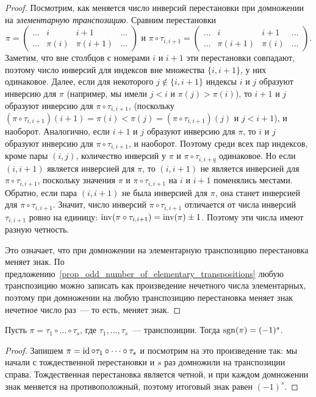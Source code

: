 \begin{proof}
Посмотрим, как меняется число инверсий перестановки при домножении на
{\it элементарную транспозицию}. Сравним перестановки
$$
\pi=\begin{pmatrix}\dots&i&i+1&\dots\\
\dots&\pi(i)&\pi(i+1)&\dots\end{pmatrix}\text{ и }
\pi\circ\tau_{i,i+1}=\begin{pmatrix}\dots&i&i+1&\dots\\
\dots&\pi(i+1)&\pi(i)&\dots\end{pmatrix}.
$$
Заметим, что вне столбцов с номерами $i$ и $i+1$ эти перестановки
совпадают, поэтому число инверсий для индексов вне множества
$\{i,i+1\}$, у них одинаковое. Далее, если для некоторого
$j\notin\{i,i+1\}$ индексы $i$ и $j$ образуют
инверсию для $\pi$ (например, мы имели $j<i$ и $\pi(j)>\pi(i)$), то
$i+1$ и $j$ образуют инверсию для $\pi\circ\tau_{i,i+1}$,
(поскольку
$(\pi\circ\tau_{i,i+1})(i+1)=\pi(i)<\pi(j)=(\pi\circ\tau_{i,i+1})(j)$
и $j<i+1$), и наоборот. Аналогично, если $i+1$ и $j$ образуют
инверсию для $\pi$, то $i$ и $j$ образуют инверсию для
$\pi\circ\tau_{i,i+1}$, и наоборот. Поэтому среди всех пар индексов,
кроме пары $(i,j)$, количество инверсий у $\pi$ и
$\pi\circ\tau_{i,i+q}$ одинаковое. Но если $(i,i+1)$ является
инверсией для $\pi$, то $(i,i+1)$ не является инверсией для
$\pi\circ\tau_{i,i+1}$, поскольку значения $\pi$ и
$\pi\circ\tau_{i,i+1}$ на $i$ и $i+1$ поменялись местами. Обратно,
если пара $(i,i+1)$ не была инверсией для $\pi$, она станет инверсией
для $\pi\circ\tau_{i,i+1}$. Значит, число инверсий
$\pi\circ\tau_{i,i+1}$ отличается от числа инверсий $\tau_{i,i+1}$
ровно на единицу: $\operatorname{inv}(\pi\circ\tau_{i,i+1})=\operatorname{inv}(\pi)\pm 1$. Поэтому
эти числа имеют разную четность.

Это означает, что при домножении на элементарную транспозицию
перестановка меняет знак. По
предложению~\ref{prop_odd_number_of_elementary_transpositions} любую
транспозицию можно записать как произведение нечетного числа
элементарных, поэтому при домножении на любую транспозицию
перестановка меняет знак нечетное число раз~--- то есть, меняет знак.
\end{proof}

\begin{corollary}\label{cor_sign_and_number_of_transpositions}
Пусть $\pi=\tau_1\circ\dots\circ\tau_s$, где $\tau_1,\dots,\tau_s$~---
транспозиции. Тогда $\operatorname{sgn}(\pi)=(-1)^s$.
\end{corollary}
\begin{proof}
Запишем $\pi=\operatorname{id}\circ\tau_1\circ\dots\circ\tau_s$ и посмотрим на это
произведение так: мы начали с тождественной перестановки и $s$ раз
домножили на транспозиции справа. Тождественная перестановка является
четной, и при каждом домножении знак меняется на противоположный,
поэтому итоговый знак равен $(-1)^s$.
\end{proof}

